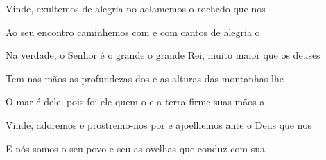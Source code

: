 \begin{greenumerate}
  \item {}Vinde, exultemos de alegria no  aclamemos o rochedo que nos 

  \item {}Ao seu encontro caminhemos com  e com cantos de alegria o 

  \item {}Na verdade, o Senhor é o grande  o grande Rei, muito maior que os deuses 

  \item {}Tem nas mãos as profundezas dos  e as alturas das montanhas lhe 

  \item {}O mar é dele, pois foi ele quem o  e a terra firme suas mãos a 

  \item {}Vinde, adoremos e prostremo-nos por  e ajoelhemos ante o Deus que nos 

  \item {}E nós somos o seu povo e seu  as ovelhas que conduz com sua 
\end{greenumerate}
